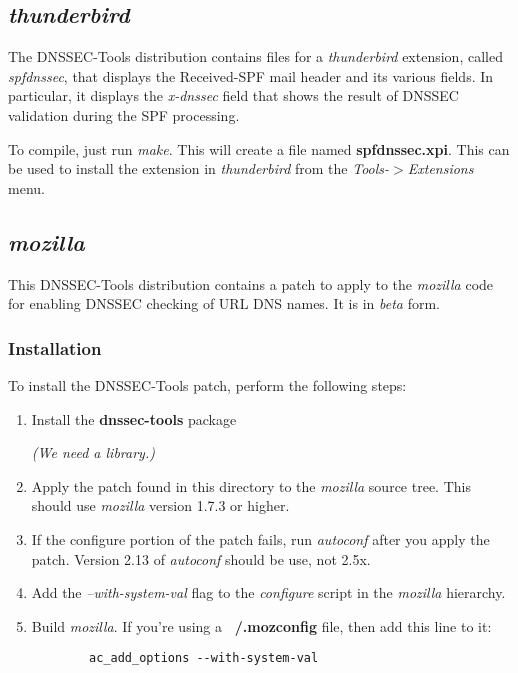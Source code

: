 \documentclass[12pt]{article}
\newcommand{\cmd}[1]{{\em #1}}
\newcommand{\path}[1]{{\bf #1}}
\begin{document}

\subsection{\cmd{thunderbird}}

The DNSSEC-Tools distribution contains files for a \cmd{thunderbird}
extension, called {\it spfdnssec}, that displays the Received-SPF mail header
and its various fields.  In particular, it displays the {\it x-dnssec} field
that shows the result of DNSSEC validation during the SPF processing.

To compile, just run \cmd{make}.  This will create a file named
\path{spfdnssec.xpi}.  This can be used to install the extension in
\cmd{thunderbird} from the {\it Tools-$>$Extensions} menu.



\subsection{\cmd{mozilla}}

This DNSSEC-Tools distribution contains a patch to apply to the \cmd{mozilla}
code for enabling DNSSEC checking of URL DNS names.  It is in {\it beta} form.


\subsubsection{Installation}

To install the DNSSEC-Tools patch, perform the following steps:

\begin{enumerate}

\item Install the \path{dnssec-tools} package

{\it (We need a library.)}

\item Apply the patch found in this directory to the \cmd{mozilla} source tree.
This should use \cmd{mozilla} version 1.7.3 or higher.

\item If the configure portion of the patch fails, run \cmd{autoconf}
after you apply the patch.  Version 2.13 of \cmd{autoconf} should be use,
not 2.5x.

\item Add the {\it --with-system-val} flag to the \cmd{configure} script in the
\cmd{mozilla} hierarchy.

\item Build \cmd{mozilla}.  If you're using a \path{~/.mozconfig} file,
then add this line to it:
\begin{verbatim}
        ac_add_options --with-system-val
\end{verbatim}

\end{enumerate}
\end{document}
